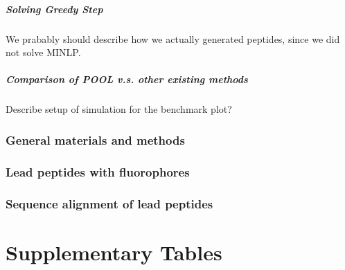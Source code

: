 \documentclass[11pt]{article}
\begin{document}
\subsubsection{Solving Greedy Step}
We prabably should describe how we actually generated peptides, since we did not solve MINLP.

\subsubsection{Comparison of POOL v.s. other existing methods}
Describe setup of simulation for the benchmark plot?


\section{General materials and methods}
\section{Lead peptides with fluorophores}
\section{Sequence alignment of lead peptides}
\part{Supplementary Tables}



\end{document}
